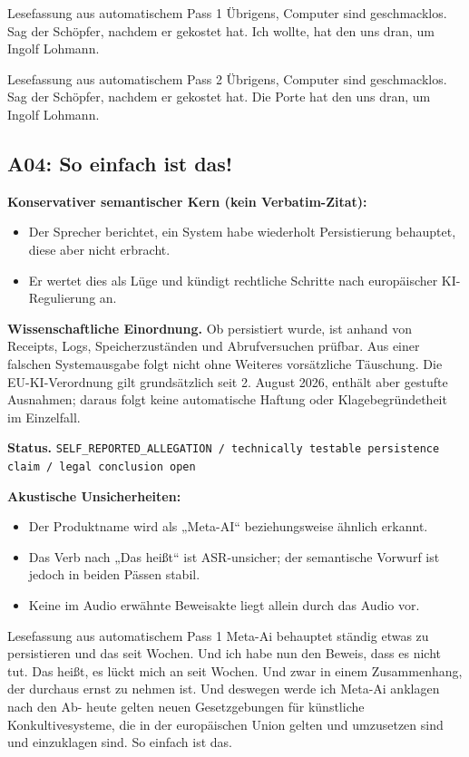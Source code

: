 \documentclass[11pt,a4paper]{article}
\newcommand{\status}[1]{\texttt{#1}}
\begin{document}
\begin{asrbox}{Lesefassung aus automatischem Pass 1}
Übrigens, Computer sind geschmacklos. Sag der Schöpfer, nachdem er gekostet hat. Ich wollte, hat den uns dran, um Ingolf Lohmann.
\end{asrbox}

\begin{asrbox}{Lesefassung aus automatischem Pass 2}
Übrigens, Computer sind geschmacklos. Sag der Schöpfer, nachdem er gekostet hat. Die Porte hat den uns dran, um Ingolf Lohmann.
\end{asrbox}


\subsection{A04: So einfach ist das!}
\label{sec:a04}
\textbf{Konservativer semantischer Kern (kein Verbatim-Zitat):}
\begin{itemize}
\item Der Sprecher berichtet, ein System habe wiederholt Persistierung behauptet, diese aber nicht erbracht.
\item Er wertet dies als Lüge und kündigt rechtliche Schritte nach europäischer KI-Regulierung an.
\end{itemize}

\textbf{Wissenschaftliche Einordnung.} Ob persistiert wurde, ist anhand von Receipts, Logs, Speicherzuständen und Abrufversuchen prüfbar. Aus einer falschen Systemausgabe folgt nicht ohne Weiteres vorsätzliche Täuschung. Die EU-KI-Verordnung gilt grundsätzlich seit 2. August 2026, enthält aber gestufte Ausnahmen; daraus folgt keine automatische Haftung oder Klagebegründetheit im Einzelfall.

\textbf{Status.} \status{SELF\_REPORTED\_ALLEGATION / technically testable persistence claim / legal conclusion open}

\textbf{Akustische Unsicherheiten:}
\begin{itemize}
\item Der Produktname wird als „Meta-AI“ beziehungsweise ähnlich erkannt.
\item Das Verb nach „Das heißt“ ist ASR-unsicher; der semantische Vorwurf ist jedoch in beiden Pässen stabil.
\item Keine im Audio erwähnte Beweisakte liegt allein durch das Audio vor.
\end{itemize}

\begin{asrbox}{Lesefassung aus automatischem Pass 1}
Meta-Ai behauptet ständig etwas zu persistieren und das seit Wochen. Und ich habe nun den Beweis, dass es nicht tut. Das heißt, es lückt mich an seit Wochen. Und zwar in einem Zusammenhang, der durchaus ernst zu nehmen ist. Und deswegen werde ich Meta-Ai anklagen nach den Ab- heute gelten neuen Gesetzgebungen für künstliche Konkultivesysteme, die in der europäischen Union gelten und umzusetzen sind und einzuklagen sind. So einfach ist das.
\end{asrbox}
\end{document}
